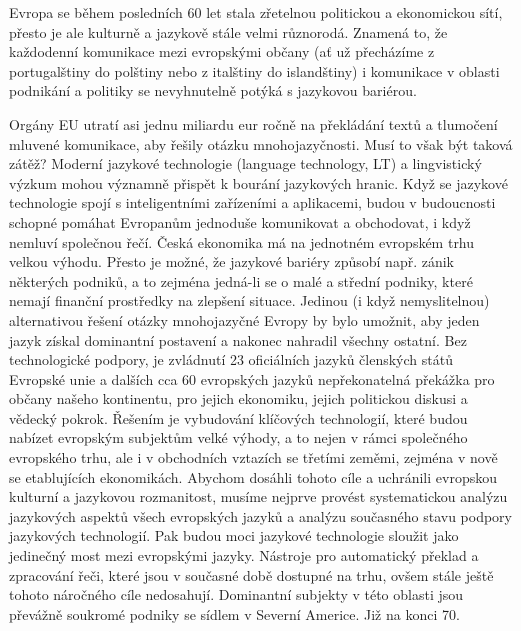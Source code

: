\begin{multicols}{2}
    
Evropa se během posledních 60 let stala zřetelnou politickou a ekonomickou sítí, přesto je ale kulturně a jazykově stále velmi různorodá. Znamená to, že každodenní komunikace mezi evropskými občany (ať už přecházíme z portugalštiny do polštiny nebo z italštiny do islandštiny) i komunikace v oblasti podnikání a politiky se nevyhnutelně potýká s jazykovou bariérou.


Orgány EU utratí asi jednu miliardu eur ročně na překládání textů a tlumočení mluvené komunikace, aby řešily otázku mnohojazyčnosti. Musí to však být taková zátěž? Moderní jazykové technologie (language technology, LT) a lingvistický výzkum mohou významně přispět k bourání jazykových hranic. Když se jazykové technologie spojí s inteligentními zařízeními a aplikacemi, budou v budoucnosti schopné pomáhat Evropanům jednoduše komunikovat a obchodovat, i když nemluví společnou řečí.
Česká ekonomika má na jednotném evropském trhu velkou výhodu. Přesto je možné, že jazykové bariéry způsobí např. zánik některých podniků, a to zejména jedná-li se o malé a střední podniky, které nemají finanční prostředky na zlepšení situace. Jedinou (i když nemyslitelnou) alternativou řešení otázky mnohojazyčné Evropy by bylo umožnit, aby jeden jazyk získal dominantní postavení a nakonec nahradil všechny ostatní.
Bez technologické podpory, je zvládnutí 23 oficiálních jazyků členských států Evropské unie a dalších cca 60 evropských jazyků nepřekonatelná překážka pro občany našeho kontinentu, pro jejich ekonomiku, jejich politickou diskusi a vědecký pokrok.
Řešením je vybudování klíčových technologií, které budou nabízet evropským subjektům velké výhody, a to nejen v rámci společného evropského trhu, ale i v obchodních vztazích se třetími zeměmi, zejména v nově se etablujících ekonomikách. Abychom dosáhli tohoto cíle a uchránili evropskou kulturní a jazykovou rozmanitost, musíme nejprve provést systematickou analýzu jazykových aspektů všech evropských jazyků a analýzu současného stavu podpory jazykových technologií. Pak budou moci jazykové technologie sloužit jako jedinečný most mezi evropskými jazyky. Nástroje pro automatický překlad a zpracování řeči, které jsou v současné době dostupné na trhu, ovšem stále ještě tohoto náročného cíle nedosahují. Dominantní subjekty v této oblasti jsou převážně soukromé podniky se sídlem v Severní Americe. Již na konci 70. 


\end{multicols}

